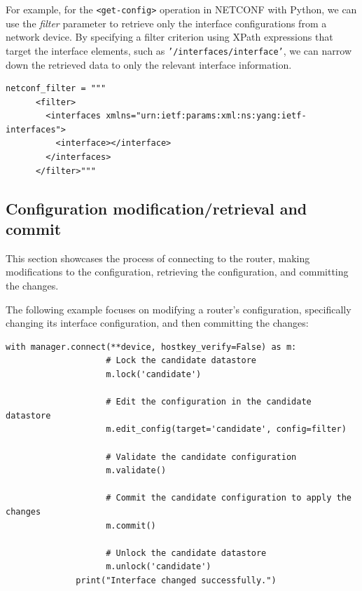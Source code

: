 For example, for the \texttt{<get-config>} operation in NETCONF with Python, we can use the \textit{filter} parameter to retrieve only the interface configurations from a network device. By specifying a filter criterion using XPath expressions that target the interface elements, such as \texttt{'/interfaces/interface'}, we can narrow down the retrieved data to only the relevant interface information.

\begin{lstlisting}[style=pythonStyle, caption={Filter for interfaces.}, backgroundcolor=\color{codebackground}]
  netconf_filter = """
      <filter>
        <interfaces xmlns="urn:ietf:params:xml:ns:yang:ietf-interfaces">
          <interface></interface>
        </interfaces>
      </filter>"""          
\end{lstlisting}

\subsection{Configuration modification/retrieval and commit}

This section showcases the process of connecting to the router, making modifications to the configuration, retrieving the configuration, and committing the changes.

The following example focuses on modifying a router's configuration, specifically changing its interface configuration, and then committing the changes:
\begin{lstlisting}[style=pythonStyle, caption={Changing the interface.}, backgroundcolor=\color{codebackground}]
              with manager.connect(**device, hostkey_verify=False) as m:
                    # Lock the candidate datastore
                    m.lock('candidate')

                    # Edit the configuration in the candidate datastore
                    m.edit_config(target='candidate', config=filter)

                    # Validate the candidate configuration
                    m.validate()

                    # Commit the candidate configuration to apply the changes
                    m.commit()

                    # Unlock the candidate datastore
                    m.unlock('candidate')
              print("Interface changed successfully.")          
\end{lstlisting}

